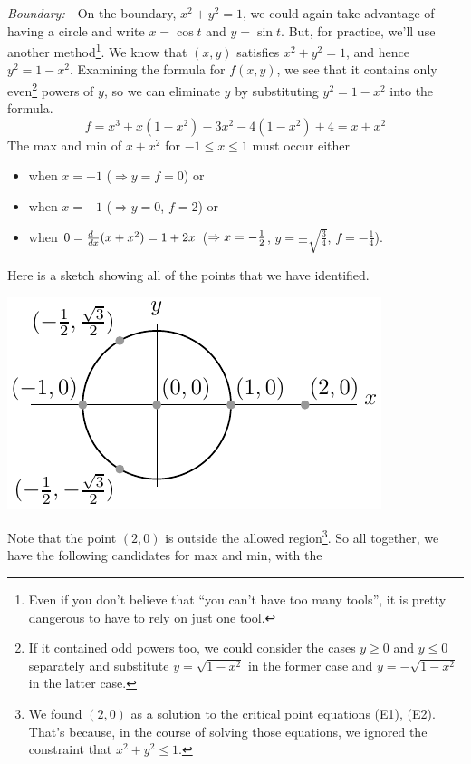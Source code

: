 \begin{eg}
\smallskip
\noindent\emph{Boundary:}\ \ 
On the boundary, $x^2+y^2=1$, we could again take advantage of having 
a circle and write $x=\cos t$ and $y=\sin t$. 
But, for practice, we'll use another method\footnote{Even if you
don't believe that ``you can't have too many tools'', it is pretty dangerous
to have to rely on just one tool.}. We know that $(x,y)$ satisfies 
$x^2+y^2=1$, and hence $y^2=1-x^2$. Examining the formula for $f(x,y)$,
we see that it contains only even\footnote{If it contained odd powers too,
we could consider the cases $y\ge 0$ and $y\le 0$ separately and
substitute $y=\sqrt{1-x^2}$ in the former case and $y=-\sqrt{1-x^2}$
in the latter case.} powers of $y$, so we can eliminate $y$
by substituting $y^2=1-x^2$ into the formula.
\begin{equation*}
f=x^3+x(1-x^2)-3x^2-4(1-x^2)+4=x+x^2
\end{equation*}
The max and min of $x+x^2$ for $-1\le x\le 1$ must occur either
\begin{itemize}
\item  when $x=-1$ ($\Rightarrow y=f=0$) or 
\item when $x=+1$ ($\Rightarrow y=0$, $f=2$) or
\item  when $0=\frac{d\hfill}{dx}(x+x^2)=1+2x$ ($\Rightarrow x=-\tfrac{1}{2}$, 
$y=\pm\sqrt{\frac{3}{4}}$, $f=-\frac{1}{4}$). 
\end{itemize}
Here is a sketch showing all of the points that we have identified.
\begin{efig}
\begin{center}
   \includegraphics[scale=0.95]{optExampleB}
\end{center}
\end{efig}
Note that the point $(2,0)$ is outside the allowed region\footnote{We 
found $(2,0)$ as a solution to the critical point equations (E1), (E2).
That's because, in the course of solving those equations, 
we ignored the constraint that $x^2+y^2\le 1$.}.
So all together, we have the following candidates for max and min, with the

\end{eg}
